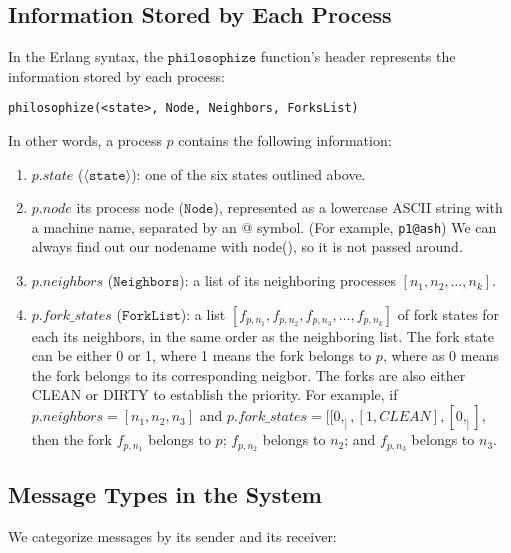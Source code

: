\documentclass[11pt]{article}
\begin{document}
\subsection{Information Stored by Each Process}
In the Erlang syntax, the $\texttt{philosophize}$ function's header represents
the information stored by each process:
\begin{lstlisting}
philosophize(<state>, Node, Neighbors, ForksList)
\end{lstlisting}
In other words, a process $p$ contains the following information:
\begin{enumerate}
\item $p.state$ ($\langle\texttt{state}\rangle$): one of the six states outlined above.
\item $p.node$ its process node ($\texttt{Node}$), represented as a lowercase ASCII string with a machine name, separated by an @ symbol. (For example, \texttt{p1@ash}) We can always find out our nodename with node(), so it is not passed around.
\item $p.neighbors$ ($\texttt{Neighbors}$): a list of its neighboring processes $[n_1, n_2, \ldots, n_k]$.
\item $p.fork\_states$ ($\texttt{ForkList}$): a list $[f_{p, n_1}, f_{p, n_2}, f_{p, n_3}, \ldots, f_{p, n_k}]$ of fork states for each its neighbors, in the same order as the neighboring list. The fork state can be either 0 or 1, where 1 means the fork belongs to $p$, where as 0 means the fork belongs to its corresponding neigbor. The forks are also either CLEAN or DIRTY to establish the priority. For example, if $p.neighbors = [n_1, n_2, n_3]$ and $p.fork\_states = [[0, _], [1, CLEAN], [0, _]],$ then the fork $f_{p, n_1}$ belongs to $p$; $f_{p, n_2}$ belongs to $n_2$;
and $f_{p, n_3}$ belongs to $n_3$.
\end{enumerate}

\subsection{Message Types in the System}
We categorize messages by its sender and its receiver:
\end{document}
